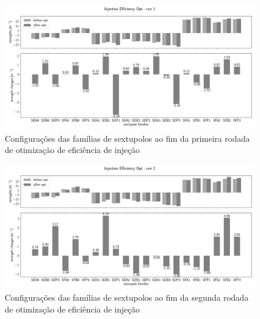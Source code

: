 \documentclass[a4paper,
               keeplastbox,   %
               ]{jacow}
\begin{document}
\begin{figure}[]
    \centering
    \includegraphics*[width=1\textwidth]{sexts_injeff_run1.png}
    \caption{Configurações das famílias de sextupolos ao fim da primeira rodada de otimização de eficiência de injeção}
    \label{inject_sexts1}
\end{figure}


\begin{figure}[]
    \centering
    \includegraphics*[width=\textwidth]{sexts_injeff_run2.png}
    \caption{Configurações das famílias de sextupolos ao fim da segunda rodada de otimização de eficiência de injeção}
    \label{inject_sexts2}
\end{figure}
\end{document}
